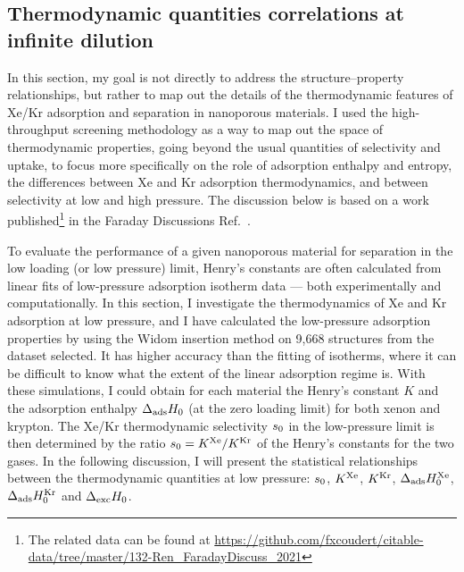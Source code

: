 \documentclass[main.tex]{subfiles}
\begin{document}
\subsection{Thermodynamic quantities correlations at infinite dilution}

In this section, my goal is not directly to address the structure--property relationships, but rather to map out the details of the thermodynamic features of Xe/Kr adsorption and separation in nanoporous materials. I used the high-throughput screening methodology as a way to map out the space of thermodynamic properties, going beyond the usual quantities of selectivity and uptake, to focus more specifically on the role of adsorption enthalpy and entropy, the differences between Xe and Kr adsorption thermodynamics, and between selectivity at low and high pressure. The discussion below is based on a work published\footnote[1]{The related data can be found at \url{https://github.com/fxcoudert/citable-data/tree/master/132-Ren_FaradayDiscuss_2021}} in the Faraday Discussions Ref.~\cite{Ren_2021}.

To evaluate the performance of a given nanoporous material for separation in the low loading (or low pressure) limit, Henry's constants are often calculated from linear fits of low-pressure adsorption isotherm data --- both experimentally and computationally. In this section, I investigate the thermodynamics of Xe and Kr adsorption at low pressure, and I have calculated the low-pressure adsorption properties by using the Widom insertion method\autocite{Widom1963, frenkel2001widom} on 9,668 structures from the dataset selected. It has higher accuracy than the fitting of isotherms, where it can be difficult to know what the extent of the linear adsorption regime is. With these simulations, I could obtain for each material the Henry's constant $K$ and the adsorption enthalpy $\Delta_{\text{ads}}H_{\text{0}}$ (at the zero loading limit) for both xenon and krypton. The Xe/Kr thermodynamic selectivity $s_{\text{0}}$ in the low-pressure limit is then determined by the ratio $s_{\text{0}} = K^{\text{Xe}}/K^{\text{Kr}}$ of the Henry's constants for the two gases. In the following discussion, I will present the statistical relationships between the thermodynamic quantities at low pressure: $s_{\text{0}}$, $K^{\text{Xe}}$, $K^{\text{Kr}}$, $\Delta_{\text{ads}}H_{\text{0}}^{\text{Xe}}$, $\Delta_{\text{ads}}H_{\text{0}}^{\text{Kr}}$ and $\Delta_{\text{exc}}H_{\text{0}}$.
\end{document}
